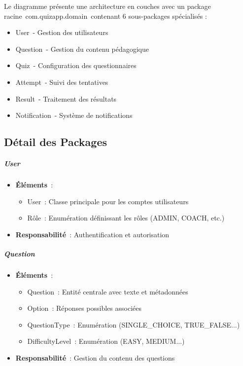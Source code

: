 \documentclass[12pt,a4paper,twoside,openright]{report}
\begin{document}
Le
diagramme présente une architecture en couches avec un package
racine~com.quizapp.domain~contenant 6 sous-packages spécialisés :

\begin{itemize}
\item
  User~- Gestion des utilisateurs
\item
  Question~- Gestion du contenu pédagogique
\item
  Quiz~- Configuration des questionnaires
\item
  Attempt~- Suivi des tentatives
\item
  Result~- Traitement des résultats
\item
  Notification~- Système de notifications
\end{itemize}

\hypertarget{detail-des-packages}{%
\subsection{Détail des Packages}\label{detail-des-packages}}

\hypertarget{user}{%
\subparagraph{User}\label{user}}

\begin{itemize}
\item
  \textbf{Éléments}~:

  \begin{itemize}
  \item
    User~: Classe principale pour les comptes utilisateurs
  \item
    Rôle~: Enumération définissant les rôles (ADMIN, COACH, etc.)
  \end{itemize}
\item
  \textbf{Responsabilité}~: Authentification et autorisation
\end{itemize}

\hypertarget{question}{%
\subparagraph{Question}\label{question}}

\begin{itemize}
\item
  \textbf{Éléments}~:

  \begin{itemize}
  \item
    Question~: Entité centrale avec texte et métadonnées
  \item
    Option~: Réponses possibles associées
  \item
    QuestionType~: Enumération (SINGLE\_CHOICE, TRUE\_FALSE...)
  \item
    DifficultyLevel~: Enumération (EASY, MEDIUM...)
  \end{itemize}
\item
  \textbf{Responsabilité}~: Gestion du contenu des questions
\end{itemize}
\end{document}
